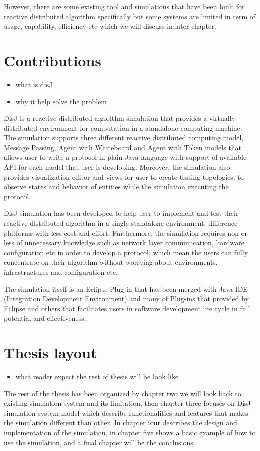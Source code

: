 However, there are some existing tool and simulations that have been built for reactive distributed algorithm specifically but some systems are limited in term of usage, capability, efficiency etc which we will discuss in later chapter.

\section{Contributions}
\begin{itemize}
\item what is disJ
\item why it help solve the problem
\end{itemize}

DisJ is a reactive distributed algorithm simulation that provides a virtually distributed environment for computation in a standalone computing machine. The simulation supports three different reactive distributed computing model, Message Passing, Agent with Whiteboard and Agent with Token models that allows user to write a protocol in plain Java language with support of available API for each model that user is developing. Moreover, the simulation also provides visualization editor and views for user to create testing topologies, to observe states and behavior of entities while the simulation executing the protocol.

DisJ simulation has been developed to help user to implement and test their reactive distributed algorithm in a single standalone environment, difference platforms with less cost and effort. Furthermore, the simulation requires non or less of unnecessary knowledge such as network layer communication, hardware configuration etc in order to develop a protocol, which mean the users can fully concentrate on their algorithm without worrying about environments, infrastructures and configuration etc.

The simulation itself is an Eclipse Plug-in that has been merged with Java IDE (Integration Development Environment) and many of Plug-ins that provided by Eclipse and others that facilitates users in software development life cycle in full potential and effectiveness.


\section{Thesis layout}
\begin{itemize}
\item what reader expect the rest of thesis will be look like
\end{itemize}

The rest of the thesis has been organized by chapter two we will look back to existing simulation system and its limitation, then chapter three focuses on DisJ simulation system model which describe functionalities and features that makes the simulation different than other. In chapter four describes the design and implementation of the simulation, in chapter five shows a basic example of how to use the simulation, and a final chapter will be the conclusions.

